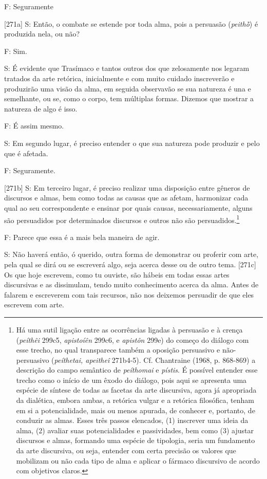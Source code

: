 F: Seguramente

{[}271a{]} S: Então, o combate se estende por toda alma, pois a
persuasão (\emph{peithṑ}) é produzida nela, ou não?

F: Sim.

S: É evidente que Trasímaco e tantos outros dos que zelosamente nos
legaram tratados da arte retórica, inicialmente e com muito cuidado
inscreverão e produzirão uma visão da alma, em seguida observavão se sua
natureza é una e semelhante, ou se, como o corpo, tem múltiplas formas.
Dizemos que mostrar a natureza de algo é isso.

F: É assim mesmo.

S: Em segundo lugar, é preciso entender o que sua natureza pode produzir
e pelo que é afetada.

F: Seguramente.

{[}271b{]} S: Em terceiro lugar, é preciso realizar uma disposição entre
gêneros de discursos e almas, bem como todas as causas que as afetam,
harmonizar cada qual ao seu correspondente e ensinar por quais causas,
necessariamente, alguns são persuadidos por determinados discursos e
outros não são persuadidos.\footnote{Há uma sutil ligação entre as
  ocorrências ligadas à persuasão e à crença (\emph{peíthêi} 299c5,
  \emph{apistoíên} 299c6, e \emph{apistôn} 299e) do começo do diálogo
  com esse trecho, no qual transparece também a oposição persuasivo e
  não-persuasivo (\emph{peíthetai, apeitheî} 271b4-5). Cf. Chantraine
  (1968, p. 868-869) a descrição do campo semântico de \emph{peíthomai}
  e \emph{pístis}. É possível entender esse trecho como o início de um
  êxodo do diálogo, pois aqui se apresenta uma espécie de síntese de
  todas as facetas da arte discursiva, agora já apropriada da dialética,
  embora ambas, a retórica vulgar e a retórica filosófica, tenham em si
  a potencialidade, mais ou menos apurada, de conhecer e, portanto, de
  conduzir as almas. Esses três passos elencados, (1) inscrever uma
  ideia da alma, (2) avaliar suas potencialidades e passividades, bem
  como (3) ajustar discursos e almas, formando uma espécie de tipologia,
  seria um fundamento da arte discursiva, ou seja, entender com certa
  precisão os valores que mobilizam ou não cada tipo de alma e aplicar o
  fármaco discursivo de acordo com objetivos claros.}

F: Parece que essa é a mais bela maneira de agir.

S: Não haverá então, ó querido, outra forma de demonstrar ou proferir
com arte, pela qual se dirá ou se escreverá algo, seja acerca desse ou
de outro tema. {[}271c{]} Os que hoje escrevem, como tu ouviste, são
hábeis em todas essas artes discursivas e as dissimulam, tendo muito
conhecimento acerca da alma. Antes de falarem e escreverem com tais
recursos, não nos deixemos persuadir de que eles escrevem com arte.

